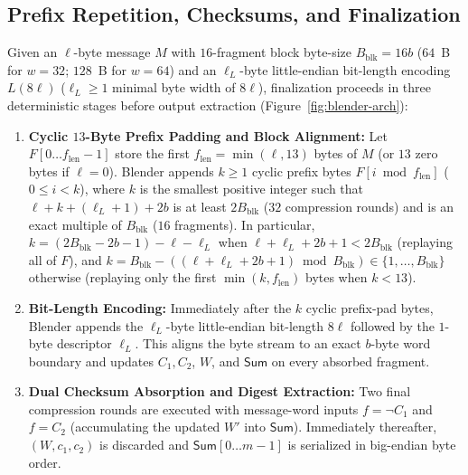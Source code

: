 \documentclass[11pt,a4paper]{article}
\theoremstyle{definition}
\theoremstyle{remark}
\newcommand{\SumAcc}{\mathsf{Sum}}
\begin{document}
\subsection{Prefix Repetition, Checksums, and Finalization}
\label{subsec:spec-final}
Given an $\ell$-byte message $M$ with $16$-fragment block byte-size $B_{\mathrm{blk}} = 16 b$ ($64$~B for $w=32$; $128$~B for $w=64$) and an $\ell_L$-byte little-endian bit-length encoding $L(8\ell)$ ($\ell_L \ge 1$ minimal byte width of $8\ell$), finalization proceeds in three deterministic stages before output extraction (Figure~\ref{fig:blender-arch}):
\begin{enumerate}[leftmargin=2em]
    \item \textbf{Cyclic $13$-Byte Prefix Padding and Block Alignment:} Let $F[0 \dots f_{\mathrm{len}}-1]$ store the first $f_{\mathrm{len}} = \min(\ell, 13)$ bytes of $M$ (or $13$ zero bytes if $\ell = 0$). Blender appends $k \ge 1$ cyclic prefix bytes $F[i \bmod f_{\mathrm{len}}]$ ($0 \le i < k$), where $k$ is the smallest positive integer such that $\ell + k + (\ell_L + 1) + 2b$ is at least $2 B_{\mathrm{blk}}$ ($32$ compression rounds) and is an exact multiple of $B_{\mathrm{blk}}$ ($16$ fragments). In particular, $k = (2 B_{\mathrm{blk}} - 2b - 1) - \ell - \ell_L$ when $\ell + \ell_L + 2b + 1 < 2 B_{\mathrm{blk}}$ (replaying all of $F$), and $k = B_{\mathrm{blk}} - ((\ell + \ell_L + 2b + 1) \bmod B_{\mathrm{blk}}) \in \{1, \dots, B_{\mathrm{blk}}\}$ otherwise (replaying only the first $\min(k, f_{\mathrm{len}})$ bytes when $k < 13$).
    \item \textbf{Bit-Length Encoding:} Immediately after the $k$ cyclic prefix-pad bytes, Blender appends the $\ell_L$-byte little-endian bit-length $8\ell$ followed by the $1$-byte descriptor $\ell_L$. This aligns the byte stream to an exact $b$-byte word boundary and updates $C_1, C_2$, $W$, and $\SumAcc$ on every absorbed fragment.
    \item \textbf{Dual Checksum Absorption and Digest Extraction:} Two final compression rounds are executed with message-word inputs $f = \neg C_1$ and $f = C_2$ (accumulating the updated $W'$ into $\SumAcc$). Immediately thereafter, $(W, c_1, c_2)$ is discarded and $\SumAcc[0 \dots m-1]$ is serialized in big-endian byte order.
\end{enumerate}
\end{document}
